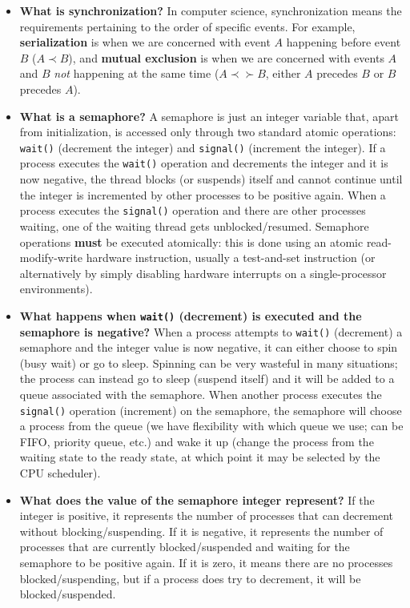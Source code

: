 \documentclass[12pt]{article}
\begin{document}
\begin{itemize}
    \item \textbf{What is synchronization?} In computer science, synchronization means the requirements pertaining to the order of specific events. For example, \textbf{serialization} is when we are concerned with event \(A\) happening before event \(B\) (\(A \prec B\)), and \textbf{mutual exclusion} is when we are concerned with events \(A\) and \(B\) \textit{not} happening at the same time (\(A \prec \succ B\), either \(A\) precedes \(B\) or \(B\) precedes \(A\)).
    \item \textbf{What is a semaphore?} A semaphore is just an integer variable that, apart from initialization, is accessed only through two standard atomic operations: \texttt{wait()} (decrement the integer) and \texttt{signal()} (increment the integer). If a process executes the \texttt{wait()} operation and decrements the integer and it is now negative, the thread blocks (or suspends) itself and cannot continue until the integer is incremented by other processes to be positive again. When a process executes the \texttt{signal()} operation and there are other processes waiting, one of the waiting thread gets unblocked/resumed. Semaphore operations \textbf{must} be executed atomically: this is done using an atomic read-modify-write hardware instruction, usually a test-and-set instruction (or alternatively by simply disabling hardware interrupts on a single-processor environments).
    \item \textbf{What happens when \texttt{wait()} (decrement) is executed and the semaphore is negative?} When a process attempts to \texttt{wait()} (decrement) a semaphore and the integer value is now negative, it can either choose to spin (busy wait) or go to sleep. Spinning can be very wasteful in many situations; the process can instead go to sleep (suspend itself) and it will be added to a queue associated with the semaphore. When another process executes the \texttt{signal()} operation (increment) on the semaphore, the semaphore will choose a process from the queue (we have flexibility with which queue we use; can be FIFO, priority queue, etc.) and wake it up (change the process from the waiting state to the ready state, at which point it may be selected by the CPU scheduler).
    \item \textbf{What does the value of the semaphore integer represent?} If the integer is positive, it represents the number of processes that can decrement without blocking/suspending. If it is negative, it represents the number of processes that are currently blocked/suspended and waiting for the semaphore to be positive again. If it is zero, it means there are no processes blocked/suspending, but if a process does try to decrement, it will be blocked/suspended.

\end{itemize}
\end{document}
